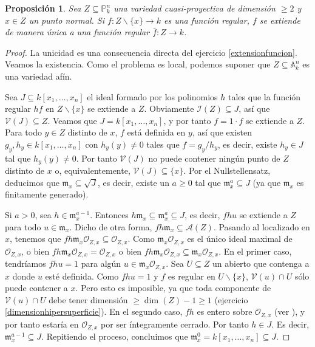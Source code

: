 \documentclass[a4paper,10pt]{book}
\newtheorem{prop}[thm]{Proposición}
\newcommand{\AAA}{\mathbb A}
\newcommand{\PP}{\mathbb P}
\newcommand{\Ank}{\AAA^n_k}
\newcommand{\Pnk}{\PP^n_k}
\newcommand{\calA}{{\mathcal A}}
\newcommand{\II}{{\mathcal I}}
\newcommand{\VV}{{\mathcal V}}
\newcommand{\mm}{{\mathfrak m}}
\begin{document}
\begin{prop}
 Sea $Z\subseteq\Pnk$ una variedad cuasi-proyectiva de dimensión $\geq 2$ y $x\in Z$ un punto normal. Si $f:Z\backslash\{x\}\to k$ es una función regular, $f$ se extiende de manera única a una función regular $\bar f:Z\to k$.
\end{prop}

\begin{proof}
 La unicidad es una consecuencia directa del ejercicio \ref{extensionfuncion}. Veamos la existencia. Como el problema es local, podemos suponer que $Z\subseteq\Ank$ es una variedad afín.

 Sea $J\subseteq k[x_1,\ldots,x_n]$ el ideal formado por los polinomios $h$ tales que la función regular $hf$ en $Z\backslash\{x\}$ se extiende a $Z$. Obviamente $\II(Z)\subseteq J$, así que $\VV(J)\subseteq Z$. Veamos que $J=k[x_1,\ldots,x_n]$, y por tanto $f=1\cdot f$ se extiende a $Z$. Para todo $y\in Z$ distinto de $x$, $f$ está definida en $y$, así que existen $g_y,h_y\in k[x_1,\ldots,x_n]$ con $h_y(y)\neq 0$ tales que $f=g_y/h_y$, es decir, existe $h_y\in J$ tal que $h_y(y)\neq 0$. Por tanto $\VV(J)$ no puede contener ningún punto de $Z$ distinto de $x$ o, equivalentemente, $\VV(J)\subseteq\{x\}$. Por el Nullstellensatz, deducimos que $\mm_x\subseteq\sqrt{J}$, es decir, existe un $a\geq 0$ tal que $\mm_x^a\subseteq J$ (ya que $\mm_x$ es finitamente generado).

Si $a>0$, sea $h\in\mm_x^{a-1}$. Entonces $h\mm_x\subseteq\mm_x^a\subseteq J$, es decir, $fhu$ se extiende a $Z$ para todo $u\in\mm_x$. Dicho de otra forma, $fh\mm_x\subseteq\calA(Z)$. Pasando al localizado en $x$, tenemos que $fh\mm_x{\mathcal O}_{Z,x}\subseteq{\mathcal O}_{Z,x}$. Como $\mm_x{\mathcal O}_{Z,x}$ es el único ideal maximal de ${\mathcal O}_{Z,x}$, o bien $fh\mm_x{\mathcal O}_{Z,x}={\mathcal O}_{Z,x}$ o bien $fh\mm_x{\mathcal O}_{Z,x}\subseteq\mm_x{\mathcal O}_{Z,x}$. En el primer caso, tendríamos $fhu=1$ para algún $u\in\mm_x{\mathcal O}_{Z,x}$. Sea $U\subseteq Z$ un abierto que contenga a $x$ donde $u$ esté definida. Como $fhu=1$ y $f$ es regular en $U\backslash\{x\}$, $\VV(u)\cap U$ sólo puede contener a $x$. Pero esto es imposible, ya que toda componente de $\VV(u)\cap U$ debe tener dimensión $\geq\dim(Z)-1\geq 1$ (ejercicio \ref{dimensionhipersuperficie}). En el segundo caso, $fh$ es entero sobre ${\mathcal O}_{Z,x}$ (ver \cite[Proposición 2.4]{am}), y por tanto estaría en ${\mathcal O}_{Z,x}$ por ser íntegramente cerrado. Por tanto $h\in J$. Es decir, $\mm_x^{a-1}\subseteq J$. Repitiendo el proceso, concluimos que $\mm_x^0=k[x_1,\ldots,x_n]\subseteq J$.
\end{proof}
\end{document}

